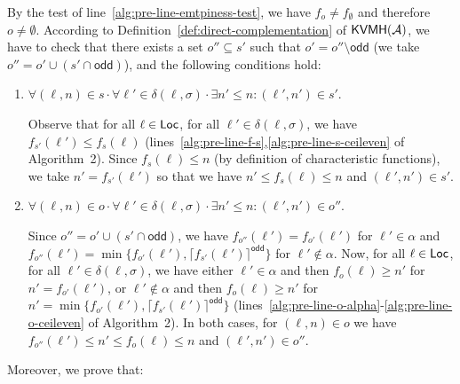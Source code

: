 \documentclass{LMCS}
\renewcommand{\l}{{\ell}}
\newcommand{\Loc}{{\sf Loc}}
\newcommand{\A}{\mathcal{A}}
\newcommand{\odd}{\mathsf{odd}}
\newcommand{\ceilOdd}[1]{\lceil \mathrel {#1} \rceil^{\mathsf{odd}}}
\newcommand{\KVMH}{{\sf KVMH}}
\begin{document}
By the test of line~\ref{alg:pre-line-emtpiness-test}, we have $f_o \neq f_{\emptyset}$
and therefore $o \neq \emptyset$. 
According to Definition~\ref{def:direct-complementation} of $\KVMH(\A)$, 
we have to check that there exists a set $o'' \subseteq s'$ such that 
$o' = o'' \setminus \odd$ (we take $o'' = o' \cup (s' \cap \odd)$), 
and the following conditions hold:
\begin{enumerate}[$(i)$]
\item $\forall (\l,n) \in s \cdot \forall \l' \in \delta(\l,\sigma)\cdot \exists n' \leq n: (\l',n') \in s'$.

		Observe that for all $\l \in \Loc$, for all $\l' \in \delta(\l,\sigma)$, 
		we have $f_{s'}(\l') \leq f_s(\l)$ (lines~\ref{alg:pre-line-f-s},\ref{alg:pre-line-s-ceileven} 
		of Algorithm~2). 
		Since $f_s(\l) \leq n$ (by definition of characteristic functions), 
		we take $n' = f_{s'}(\l')$ so that we have $n' \leq f_s(\l) \leq n$ and $(\l',n') \in s'$. 
		
\item $\forall (\l,n) \in o \cdot \forall \l' \in \delta(\l,\sigma)\cdot \exists n' \leq n: (\l',n') \in o''$.

		Since $o'' = o' \cup (s' \cap \odd)$, we have $f_{o''}(\l') = f_{o'}(\l')$ for $\l' \in \alpha$
		and $f_{o''}(\l') = \min\{ f_{o'}(\l'), \ceilOdd{f_{s'}(\l')} \}$ for $\l' \not\in \alpha$.
		Now, for all $\l \in \Loc$, for all $\l' \in \delta(\l,\sigma)$, 
		we have either $\l' \in \alpha$ and then $f_o(\l) \geq n'$ for $n' = f_{o'}(\l')$, 
		or $\l' \not\in \alpha$ and then $f_o(\l) \geq n'$ for $n' = \min\{ f_{o'}(\l'), \ceilOdd{f_{s'}(\l')} \}$
		(lines~\ref{alg:pre-line-o-alpha}-\ref{alg:pre-line-o-ceileven} 
		of Algorithm~2).
		In both cases, for $(\l,n) \in o$ we have $f_{o''}(\l') \leq n' \leq f_o(\l) \leq n$ and $(\l',n') \in o''$.
\end{enumerate}
Moreover, we prove that:
\end{document}
